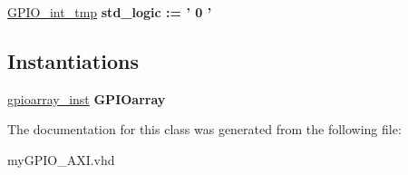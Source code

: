 \begin{DoxyCompactItemize}
\item 
\hypertarget{classmy_g_p_i_o___a_x_i_1_1arch__imp_ga7ddc27ce3ab4572421b8eb115d2c9753}{\hyperlink{group__my_g_p_i_o_ga7ddc27ce3ab4572421b8eb115d2c9753}{G\+P\+I\+O\+\_\+int\+\_\+tmp} {\bfseries \textcolor{vhdlchar}{std\+\_\+logic}\textcolor{vhdlchar}{ }\textcolor{vhdlchar}{ }\textcolor{vhdlchar}{\+:}\textcolor{vhdlchar}{=}\textcolor{vhdlchar}{ }\textcolor{vhdlchar}{ }\textcolor{vhdlchar}{'}\textcolor{vhdlchar}{ } \textcolor{vhdldigit}{0} \textcolor{vhdlchar}{ }\textcolor{vhdlchar}{'}\textcolor{vhdlchar}{ }} }\label{classmy_g_p_i_o___a_x_i_1_1arch__imp_ga7ddc27ce3ab4572421b8eb115d2c9753}

\end{DoxyCompactItemize}
\subsection*{Instantiations}
 \begin{DoxyCompactItemize}
\item 
\hypertarget{classmy_g_p_i_o___a_x_i_1_1arch__imp_aa9405ada469e1caaeffbfe0b4d9c061e}{\hyperlink{classmy_g_p_i_o___a_x_i_1_1arch__imp_aa9405ada469e1caaeffbfe0b4d9c061e}{gpioarray\+\_\+inst}  {\bfseries G\+P\+I\+Oarray}   }\label{classmy_g_p_i_o___a_x_i_1_1arch__imp_aa9405ada469e1caaeffbfe0b4d9c061e}

\end{DoxyCompactItemize}


The documentation for this class was generated from the following file\+:\begin{DoxyCompactItemize}
\item 
my\+G\+P\+I\+O\+\_\+\+A\+X\+I.\+vhd\end{DoxyCompactItemize}
